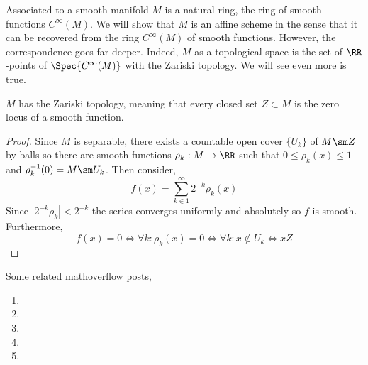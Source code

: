 \documentclass[12pt]{article}
\begin{document}
\newcommand{\aff}{\mathrm{aff}}

Associated to a smooth manifold $M$ is a natural ring, the ring of smooth functions $C^{\infty}(M)$. We will show that $M$ is an affine scheme in the sense that it can be recovered from the ring $C^{\infty}(M)$ of smooth functions. However, the correspondence goes far deeper. Indeed, $M$ as a topological space is the set of $\RR$-points of $\Spec{C^{\infty}(M)}$ with the Zariski topology. We will see even more is true. 

\begin{lemma}
$M$ has the Zariski topology, meaning that every closed set $Z \subset M$ is the zero locus of a smooth function.
\end{lemma}

\begin{proof}
Since $M$ is separable, there exists a countable open cover $\{ U_k \}$ of $M \sm Z$ by balls so there are smooth functions $\rho_k : M \to \RR$ such that $0 \le \rho_k(x) \le 1$ and $\rho_k^{-1}(0) = M \sm U_k$. Then consider,
\[ f(x) = \sum_{k \in 1}^\infty 2^{-k} \rho_k(x) \]
Since $| 2^{-k} \rho_k | < 2^{-k}$ the series converges uniformly and absolutely so $f$ is smooth. Furthermore,
\[ f(x) = 0 \iff \forall k : \rho_k(x) = 0 \iff \forall k : x \notin U_k \iff x Z \]
\end{proof}

\begin{rmk}
Some related mathoverflow posts,
\begin{enumerate}
\item {}

\item {}

\item {}

\item {}

\item {}
\end{enumerate}
\end{rmk}
\end{document}
